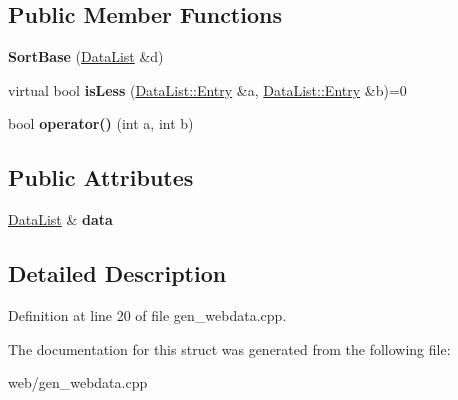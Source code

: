 \subsection*{Public Member Functions}
\begin{DoxyCompactItemize}
\item 
\hypertarget{struct_sort_base_a2210fd5de8bae48ec2009d76861484c2}{{\bfseries Sort\-Base} (\hyperlink{struct_data_list}{Data\-List} \&d)}\label{struct_sort_base_a2210fd5de8bae48ec2009d76861484c2}

\item 
\hypertarget{struct_sort_base_aee784043cb25b5a10781d6af35081110}{virtual bool {\bfseries is\-Less} (\hyperlink{struct_data_list_1_1_entry}{Data\-List\-::\-Entry} \&a, \hyperlink{struct_data_list_1_1_entry}{Data\-List\-::\-Entry} \&b)=0}\label{struct_sort_base_aee784043cb25b5a10781d6af35081110}

\item 
\hypertarget{struct_sort_base_a94103419bf8956d1d15e143dd166fd8f}{bool {\bfseries operator()} (int a, int b)}\label{struct_sort_base_a94103419bf8956d1d15e143dd166fd8f}

\end{DoxyCompactItemize}
\subsection*{Public Attributes}
\begin{DoxyCompactItemize}
\item 
\hypertarget{struct_sort_base_aeb81ba981eef0dadea992a757de4d9f7}{\hyperlink{struct_data_list}{Data\-List} \& {\bfseries data}}\label{struct_sort_base_aeb81ba981eef0dadea992a757de4d9f7}

\end{DoxyCompactItemize}


\subsection{Detailed Description}


Definition at line 20 of file gen\-\_\-webdata.\-cpp.



The documentation for this struct was generated from the following file\-:\begin{DoxyCompactItemize}
\item 
web/gen\-\_\-webdata.\-cpp\end{DoxyCompactItemize}
